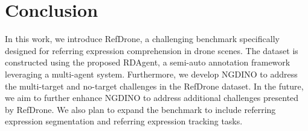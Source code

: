 \section{Conclusion}
In this work, we introduce RefDrone, a challenging benchmark specifically designed for referring expression comprehension in drone scenes. The dataset is constructed using the proposed RDAgent, a semi-auto annotation framework leveraging a multi-agent system. Furthermore, we develop NGDINO to address the multi-target and no-target challenges in the RefDrone dataset. In the future, we aim to further enhance NGDINO to address additional challenges presented by RefDrone. We also plan to expand the benchmark to include referring expression segmentation and referring expression tracking tasks.
